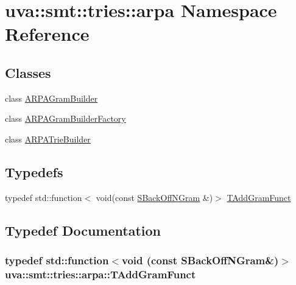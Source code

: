 \hypertarget{namespaceuva_1_1smt_1_1tries_1_1arpa}{}\section{uva\+:\+:smt\+:\+:tries\+:\+:arpa Namespace Reference}
\label{namespaceuva_1_1smt_1_1tries_1_1arpa}
\subsection*{Classes}
\begin{DoxyCompactItemize}
\item 
class \hyperlink{classuva_1_1smt_1_1tries_1_1arpa_1_1_a_r_p_a_gram_builder}{A\+R\+P\+A\+Gram\+Builder}
\item 
class \hyperlink{classuva_1_1smt_1_1tries_1_1arpa_1_1_a_r_p_a_gram_builder_factory}{A\+R\+P\+A\+Gram\+Builder\+Factory}
\item 
class \hyperlink{classuva_1_1smt_1_1tries_1_1arpa_1_1_a_r_p_a_trie_builder}{A\+R\+P\+A\+Trie\+Builder}
\end{DoxyCompactItemize}
\subsection*{Typedefs}
\begin{DoxyCompactItemize}
\item 
typedef std\+::function$<$ void(const \hyperlink{structuva_1_1smt_1_1tries_1_1_s_back_off_n_gram}{S\+Back\+Off\+N\+Gram} \&)$>$ \hyperlink{namespaceuva_1_1smt_1_1tries_1_1arpa_a16805e23db5ab5a826e46ae4a59a0a71}{T\+Add\+Gram\+Funct}
\end{DoxyCompactItemize}


\subsection{Typedef Documentation}
\hypertarget{namespaceuva_1_1smt_1_1tries_1_1arpa_a16805e23db5ab5a826e46ae4a59a0a71}{}
\subsubsection[{T\+Add\+Gram\+Funct}]{\setlength{\rightskip}{0pt plus 5cm}typedef std\+::function$<$void (const {\bf S\+Back\+Off\+N\+Gram}\&)$>$ {\bf uva\+::smt\+::tries\+::arpa\+::\+T\+Add\+Gram\+Funct}}\label{namespaceuva_1_1smt_1_1tries_1_1arpa_a16805e23db5ab5a826e46ae4a59a0a71}
